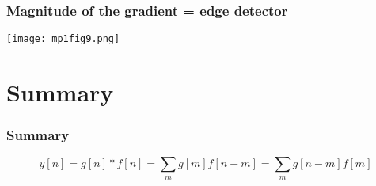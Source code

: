 \documentclass{beamer}
\begin{document}
\begin{frame}
  \frametitle{Magnitude of the gradient = edge detector}
      
  \centerline{\texttt{[image: mp1fig9.png]}}
\end{frame}

\section[Summary]{Summary}
\setcounter{subsection}{1}
\begin{frame}
  \frametitle{Summary}

    \[
    y[n] = g[n]\ast f[n] = \sum_m g[m] f[n-m] = \sum_m g[n-m] f[m]
    \]
\end{frame}
\end{document}

